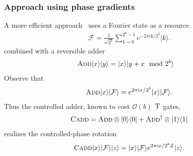 \documentclass[a4paper,onecolumn,10pt,accepted=2024-05-22]{quantumarticle}
\newcommand{\ket}[1]{| #1\rangle}        %
\newcommand{\bra}[1]{\langle #1|}        %
\begin{document}
	\subsubsection{Approach using phase gradients}
	A more efficient approach~\cite{Gidney2018Addition} uses a Fourier state as a resource
	\begin{align}
	\mathcal{F}=\frac{1}{\sqrt{2^b}}\sum_{k=0}^{2^b-1}e^{-2\pi i k/2^b}\ket{k}.
	\end{align}
	combined with a reversible adder
	\begin{align}
	\textsc{Add}\ket{x}\ket{y}&=\ket{x}\ket{{y+x}\mod{2^b}}
	\end{align}
	Observe that
	\begin{align}
	\textsc{Add}\ket{x}\ket{\mathcal{F}}=e^{2\pi i x/2^b}\ket{x}\ket{\mathcal{F}}.
	\end{align}
	Thus the controlled adder, known to cost $\mathcal{O}(b)$ $\textsc{T}$ gates, 
	\begin{align}
	\textsc{Cadd}=\textsc{Add}\otimes\ket{0}\bra{0}+\textsc{Add}^\dag\otimes\ket{1}\bra{1}
	\end{align}
	realizes the controlled-phase rotation
	\begin{align}
	\textsc{Cadd}\ket{x}\ket{\mathcal{F}}\ket{z}=\ket{x}\ket{\mathcal{F}}e^{2\pi i x/2^b Z}\ket{z}.
	\end{align}
	
\end{document}
